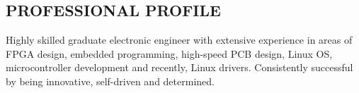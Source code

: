 \documentclass[3pt]{res}
\begin{document}
\thispagestyle{empty} %



\begin{resume}

\section{PROFESSIONAL PROFILE}
\vspace{0.1in}
  Highly skilled graduate electronic engineer with extensive experience in areas of FPGA design, embedded programming, high-speed PCB design, Linux OS, microcontroller development and recently, Linux drivers. Consistently successful by being innovative, self-driven and determined.


\end{resume}
\end{document}

